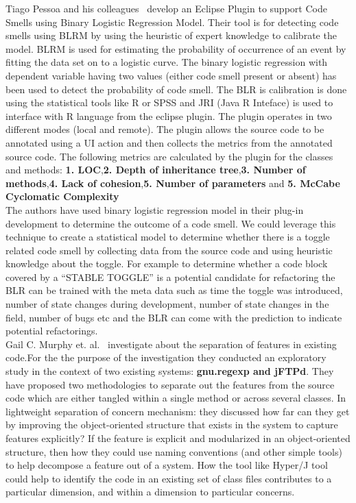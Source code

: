 \documentclass[conference]{IEEEtran}
\begin{document}
Tiago Pessoa and his colleagues~\cite{pessoa2012eclipse} develop an Eclipse Plugin to support Code Smells using Binary Logistic Regression Model. Their tool is for detecting code smells using BLRM by using the heuristic of expert knowledge to calibrate the model. BLRM is used for estimating the probability of occurrence of an event by fitting the data set on to a logistic curve. The binary logistic regression with dependent variable having two values (either code smell present or absent) has been used to detect the probability of code smell. The BLR is calibration is done using the statistical tools like R or SPSS and JRI (Java R Inteface) is used to interface with R language from the eclipse plugin. The plugin operates in two different modes (local and remote). The plugin allows the source code to be annotated using a UI action and then collects the metrics from the annotated source code. The following metrics are calculated by the plugin for the classes and methods: \textbf{1. LOC},\textbf{2. Depth of inheritance tree},\textbf{3. Number of methods},\textbf{4. Lack of cohesion},\textbf{5. Number of parameters} and \textbf{5. McCabe Cyclomatic Complexity}\\

The authors have used binary logistic regression model in their plug-in development to determine the outcome of a code smell. We could leverage this technique to create a statistical model to determine whether there is a toggle related code smell by collecting data from the source code and using heuristic knowledge about the toggle. For example to determine whether a code block covered by a  “STABLE TOGGLE” is a potential candidate for refactoring the BLR can be trained with the meta data such as time the toggle was introduced, number of state changes during development, number of state changes in the field, number of bugs etc and the BLR can come with the prediction to indicate potential refactorings.\\

Gail C. Murphy et. al.~\cite{murphy2001separating} investigate about the separation of features in existing code.For the the purpose of the investigation they conducted an exploratory study in the context of two existing systems: \textbf{gnu.regexp and jFTPd}. They have proposed two methodologies to separate out the features from the source code which are either tangled within a single method or across several classes. In lightweight separation of concern mechanism: they discussed how far can they get by improving the object-oriented structure that exists in the system to capture features explicitly? If the feature is explicit and modularized in an object-oriented structure, then how they could use naming conventions (and other simple tools) to help decompose a feature out of a system. How the tool like Hyper/J tool could help to identify the code in an existing set of class files contributes to a particular dimension, and within a dimension to particular concerns.\\
\end{document}
